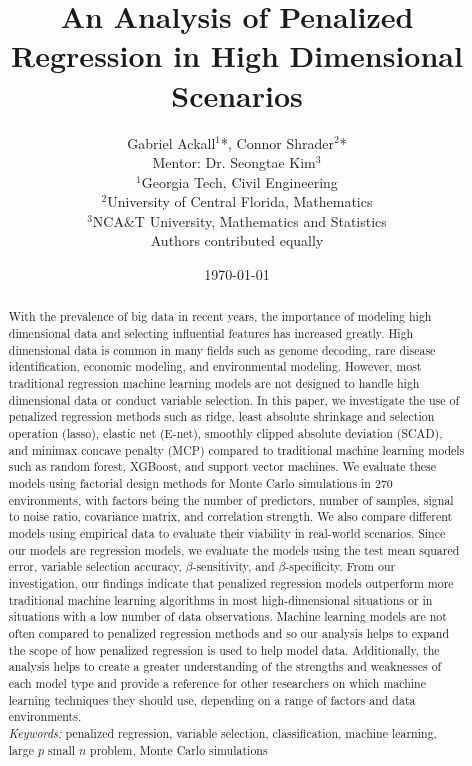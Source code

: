 \documentclass{article}
\title{An Analysis of Penalized Regression in High Dimensional Scenarios}
\author{Gabriel Ackall$^1$*, Connor Shrader$^2$* \\
	Mentor: Dr. Seongtae Kim$^3$ \\	
	{\footnotesize $^1$Georgia Tech, Civil Engineering} \\
	{\footnotesize $^2$University of Central  Florida, Mathematics} \\
	{\footnotesize $^3$NCA\&T University, Mathematics and Statistics} \\
	{\footnotesize *Authors contributed equally}}
\date{\today}
\begin{document}
	\maketitle
	\begin{abstract}
		With the prevalence of big data in recent years, the importance of modeling high dimensional data and selecting influential features has increased greatly. High dimensional data is common in many fields such as genome decoding, rare disease identification, economic modeling, and environmental modeling. However, most traditional regression machine learning models are not designed to handle high dimensional data or conduct variable selection. In this paper, we investigate the use of penalized regression methods such as ridge, least absolute shrinkage and selection operation (lasso), elastic net (E-net), smoothly clipped absolute deviation (SCAD), and minimax concave penalty (MCP) compared to traditional machine learning models such as random forest, XGBoost, and support vector machines. We evaluate these models using factorial design methods for Monte Carlo simulations in 270 environments, with factors being the number of predictors, number of samples, signal to noise ratio, covariance matrix, and correlation strength. We also compare different models using empirical data to evaluate their viability in real-world scenarios. Since our models are regression models, we evaluate the models using the test mean squared error, variable selection accuracy, $\beta$-sensitivity, and $\beta$-specificity. From our investigation, our findings indicate that penalized regression models outperform more traditional machine learning algorithms in most high-dimensional situations or in situations with a low number of data observations. Machine learning models are not often compared to penalized regression methods and so our analysis helps to expand the scope of how penalized regression is used to help model data. Additionally, the analysis helps to create a greater understanding of the strengths and weaknesses of each model type and provide a reference for other researchers on which machine learning techniques they should use, depending on a range of factors and data environments. \\
		
		\textit{Keywords:} penalized regression, variable selection, classification, machine learning, large $p$ small $n$ problem, Monte Carlo simulations
	\end{abstract}
	
	\newpage
	\tableofcontents
	\newpage
	
\end{document}
